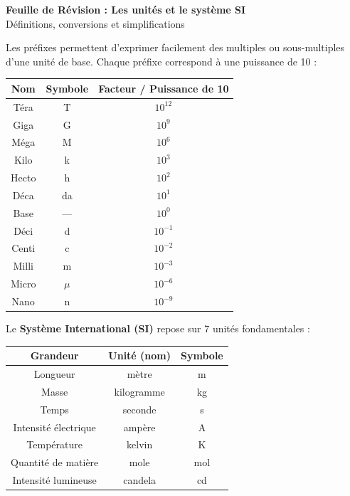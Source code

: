 \documentclass[11pt,a4paper]{article}
\newcommand{\rulebox}[3]{
\begin{tcolorbox}[colback=#1!10!white,colframe=#1!60!black,title=\textbf{#2}]
#3
\end{tcolorbox}
}
\begin{document}
\begin{center}
{\LARGE \textbf{Feuille de Révision : Les unités et le système SI}}\\[0.5cm]
{\large Définitions, conversions et simplifications}
\end{center}

\rulebox{blue}{Préfixes et ordres de grandeur}{
Les préfixes permettent d’exprimer facilement des multiples ou sous-multiples d’une unité de base.  
Chaque préfixe correspond à une puissance de 10 :

\begin{center}
\begin{tabular}{|c|c|c|}
\hline
\textbf{Nom} & \textbf{Symbole} & \textbf{Facteur / Puissance de 10} \\
\hline
Téra & T & $10^{12}$ \\
Giga & G & $10^{9}$ \\
Méga & M & $10^{6}$ \\
Kilo & k & $10^{3}$ \\
Hecto & h & $10^{2}$ \\
Déca & da & $10^{1}$ \\
\hline
Base & — & $10^{0}$ \\
\hline
Déci & d & $10^{-1}$ \\
Centi & c & $10^{-2}$ \\
Milli & m & $10^{-3}$ \\
Micro & $\mu$ & $10^{-6}$ \\
Nano & n & $10^{-9}$ \\
\hline
\end{tabular}
\end{center}
}

\rulebox{green}{Les grandeurs physiques et leurs unités}{
Le \textbf{Système International (SI)} repose sur 7 unités fondamentales :

\begin{center}
\begin{tabular}{|c|c|c|}
\hline
\textbf{Grandeur} & \textbf{Unité (nom)} & \textbf{Symbole} \\
\hline
Longueur & mètre & m \\
Masse & kilogramme & kg \\
Temps & seconde & s \\
Intensité électrique & ampère & A \\
Température & kelvin & K \\
Quantité de matière & mole & mol \\
Intensité lumineuse & candela & cd \\
\hline
\end{tabular}
\end{center}
}
\end{document}
